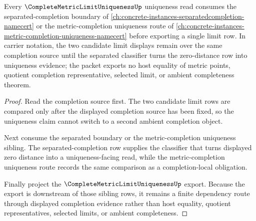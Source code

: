 \begin{theorem}
\label{thm:complete-metric-limit-uniqueness-separated-completion-limit-route}
Every $\CompleteMetricLimitUniquenessUp$ uniqueness read consumes the separated-completion boundary of \autoref{ch:concrete-instances-separatedcompletion-namecert} or the metric-completion uniqueness route of \autoref{ch:concrete-instances-metric-completion-uniqueness-namecert} before exporting a single limit row. In carrier notation, the two candidate limit displays remain over the same completion source until the separated classifier turns the zero-distance row into uniqueness evidence; the packet exports no host equality of metric points, quotient completion representative, selected limit, or ambient completeness theorem.
\end{theorem}
\begin{proof}
Read the completion source first. The two candidate limit rows are compared only after the displayed completion source has been fixed, so the uniqueness claim cannot switch to a second ambient completion object.

Next consume the separated boundary or the metric-completion uniqueness sibling. The separated-completion row supplies the classifier that turns displayed zero distance into a uniqueness-facing read, while the metric-completion uniqueness route records the same comparison as a completion-local obligation.

Finally project the $\CompleteMetricLimitUniquenessUp$ export. Because the export is downstream of those sibling rows, it remains a finite dependency route through displayed completion evidence rather than host equality, quotient representatives, selected limits, or ambient completeness.
\end{proof}
